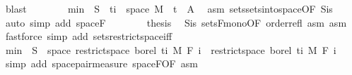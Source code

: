 \begin{isabellebody}
\ blast\isanewline
\ \ \ \ \ \ \isamarkupfalse%
\ {\isachardoublequoteopen}{\isacharquery}{\kern0pt}min\ {\isacharminus}{\kern0pt}{\isacharbackquote}{\kern0pt}\ S\ {\isasyminter}\ {\isacharparenleft}{\kern0pt}{\isacharbraceleft}{\kern0pt}ti{\isacharbraceright}{\kern0pt}\ {\isasymtimes}\ space\ M{\isacharparenright}{\kern0pt}\ {\isacharequal}{\kern0pt}\ {\isacharbraceleft}{\kern0pt}t\ {\isasymtimes}\ A{\isachardoublequoteclose}\ \isamarkupfalse%
\ asm\ sets{\isachardot}{\kern0pt}sets{\isacharunderscore}{\kern0pt}into{\isacharunderscore}{\kern0pt}space{\isacharbrackleft}{\kern0pt}OF\ S{\isacharunderscore}{\kern0pt}is{\isacharparenleft}{\kern0pt}{}{\isacharparenright}{\kern0pt}{\isacharbrackright}{\kern0pt}\ \isamarkupfalse%
\ {\isacharparenleft}{\kern0pt}auto\ simp\ add{\isacharcolon}{\kern0pt}\ space{\isacharunderscore}{\kern0pt}F{\isacharparenright}{\kern0pt}\isanewline
\ \ \ \ \ \ \isamarkupfalse%
\ {\isacharquery}{\kern0pt}thesis\ \isamarkupfalse%
\ S{\isacharunderscore}{\kern0pt}is\ sets{\isacharunderscore}{\kern0pt}F{\isacharunderscore}{\kern0pt}mono{\isacharbrackleft}{\kern0pt}OF\ order{\isacharunderscore}{\kern0pt}refl\ asm{\isacharbrackright}{\kern0pt}\ asm\ \isamarkupfalse%
\ {\isacharparenleft}{\kern0pt}fastforce\ simp\ add{\isacharcolon}{\kern0pt}\ sets{\isacharunderscore}{\kern0pt}restrict{\isacharunderscore}{\kern0pt}space{\isacharunderscore}{\kern0pt}iff{\isacharparenright}{\kern0pt}\isanewline
\ \ \ \ \isamarkupfalse%
\isanewline
\ \ \ \ \isamarkupfalse%
\ {\isachardoublequoteopen}{\isacharquery}{\kern0pt}min\ {\isacharminus}{\kern0pt}{\isacharbackquote}{\kern0pt}\ S\ {\isasyminter}\ space\ {\isacharparenleft}{\kern0pt}restrict{\isacharunderscore}{\kern0pt}space\ borel\ {\isacharbraceleft}{\kern0pt}ti{\isacharbraceright}{\kern0pt}\ {\isasymOtimes}\isactrlsub M\ F\ i{\isacharparenright}{\kern0pt}\ {\isasymin}\ restrict{\isacharunderscore}{\kern0pt}space\ borel\ {\isacharbraceleft}{\kern0pt}ti{\isacharbraceright}{\kern0pt}\ {\isasymOtimes}\isactrlsub M\ F\ i{\isachardoublequoteclose}\ \isamarkupfalse%
\ {\isacharparenleft}{\kern0pt}simp\ add{\isacharcolon}{\kern0pt}\ space{\isacharunderscore}{\kern0pt}pair{\isacharunderscore}{\kern0pt}measure\ space{\isacharunderscore}{\kern0pt}F{\isacharbrackleft}{\kern0pt}OF\ asm{\isacharbrackright}{\kern0pt}{\isacharparenright}{\kern0pt}\isanewline

\end{isabellebody}
